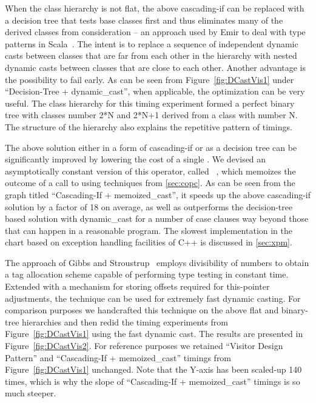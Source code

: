 When the class hierarchy is not flat, the above cascading-if can be replaced 
with a decision tree that tests base classes first and thus eliminates many of 
the derived classes from consideration -- an approach used by Emir to deal with 
type patterns in Scala~\cite[]{EmirThesis}. The intent is to 
replace a sequence of independent dynamic casts between classes that are far 
from each other in the hierarchy with nested dynamic casts between classes that 
are close to each other. Another advantage is the possibility to fail early. 
As can be seen from Figure~\ref{fig:DCastVis1} under ``Decision-Tree + 
dynamic\_cast'', when applicable, the optimization can be very useful. The class
hierarchy for this timing experiment formed a perfect binary tree with 
classes number 2*N and 2*N+1 derived from a class with number N. The structure 
of the hierarchy also explains the repetitive pattern of timings.

The above solution either in a form of cascading-if or as a decision tree can be 
significantly improved by lowering the cost of a single . 
We devised an asymptotically constant version of this operator, called
~\cite{TR}, which memoizes the outcome of a call to 
 using techniques from \textsection\ref{sec:copc}. As can be 
seen from the graph titled ``Cascading-If + memoized\_cast'', it speeds up the 
above cascading-if solution by a factor of 18 on average, as well as outperforms 
the decision-tree based solution with dynamic\_cast for a number of case clauses 
way beyond those that can happen in a reasonable program. The slowest 
implementation in the chart based on exception handling facilities of C++ is 
discussed in \textsection\ref{sec:xpm}.

The approach of Gibbs and Stroustrup~\cite{FastDynCast} employs divisibility of 
numbers to obtain a tag allocation scheme capable of performing type testing in 
constant time. Extended with a mechanism for storing offsets required for 
this-pointer adjustments, the technique can be used for extremely fast dynamic 
casting. For comparison purposes we handcrafted this technique on the above flat 
and binary-tree hierarchies and then redid the timing experiments from 
Figure~\ref{fig:DCastVis1} using the fast dynamic cast. The results are 
presented in Figure~\ref{fig:DCastVis2}. For reference purposes we retained 
``Visitor Design Pattern'' and ``Cascading-If + memoized\_cast'' timings from 
Figure~\ref{fig:DCastVis1} unchanged. Note that the Y-axis has been scaled-up 
140 times, which is why the slope of ``Cascading-If + memoized\_cast'' timings 
is so much steeper.

